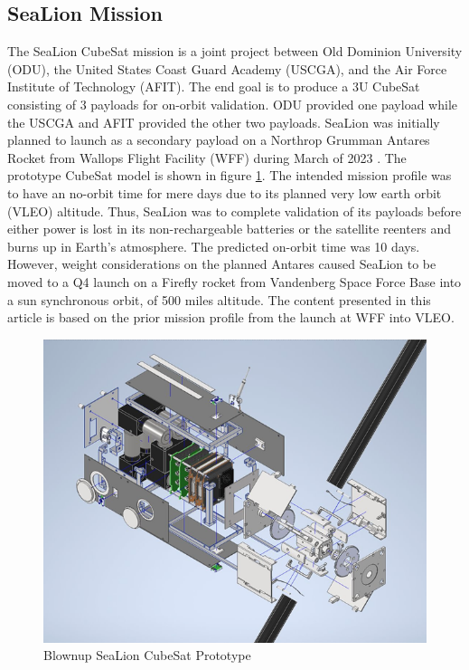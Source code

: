 \documentclass[journal,article,submit,pdftex,moreauthors]{Definitions/mdpi}
\begin{document}
\subsection{SeaLion Mission}
The SeaLion CubeSat mission is a joint project between Old Dominion University (ODU), the United States Coast Guard Academy (USCGA), and the Air Force Institute of Technology (AFIT).  The end goal is to produce a 3U CubeSat consisting of 3 payloads for on-orbit validation.  ODU provided one payload while the USCGA and AFIT provided the other two payloads.  SeaLion was initially planned to launch as a secondary payload on a Northrop Grumman Antares Rocket from Wallops Flight Facility (WFF) during March of 2023 \cite{sealion_cdr}.  The prototype CubeSat model is shown in figure \ref{fig:cubesat_blowup}.  The intended mission profile was to have an no-orbit time for mere days due to its planned very low earth orbit (VLEO) altitude.  Thus, SeaLion was to complete validation of its payloads before either power is lost in its non-rechargeable batteries or the satellite reenters and burns up in Earth's atmosphere.  The predicted on-orbit time was 10 days.  However, weight considerations on the planned Antares caused SeaLion to be moved to a Q4 launch on a Firefly rocket from Vandenberg Space Force Base into a sun synchronous orbit, of 500 miles altitude.  The content presented in this article is based on the prior mission profile from the launch at WFF into VLEO.

\begin{figure}[H]
    \includegraphics[width=10.5 cm]{assets/cubesat_blownup.png}
    \caption{Blownup SeaLion CubeSat Prototype}
	\label{fig:cubesat_blowup}
    \end{figure}
	\noindent   
\unskip
\end{document}

